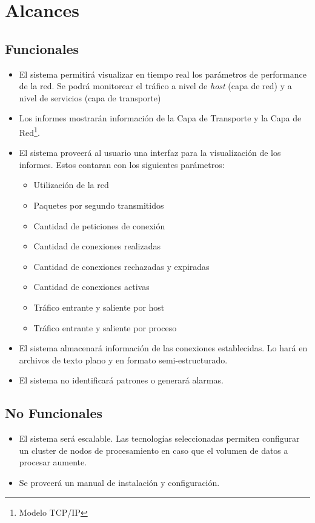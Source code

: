\section*{Alcances}

\subsection*{Funcionales}
\begin{itemize}
	\item El sistema permitirá visualizar en tiempo real los parámetros de performance de la red. Se podrá monitorear el tráfico a nivel de \textit{host} (capa de red) y a nivel de servicios (capa de transporte)
	\item Los informes mostrarán información de la Capa de Transporte y la Capa de Red\footnote{Modelo TCP/IP}. \cite{rfc791}\cite{rfc793}\cite{rfc1180}
	\item El sistema proveerá al usuario una interfaz para la visualización de los informes. Estos contaran con los siguientes parámetros:
	\begin{itemize}
		\item Utilización de la red
		\item Paquetes por segundo transmitidos
		\item Cantidad de peticiones de conexión
		\item Cantidad de conexiones realizadas
		\item Cantidad de conexiones rechazadas y expiradas
		\item Cantidad de conexiones activas
		\item Tráfico entrante y saliente por host
		\item Tráfico entrante y saliente por proceso
	\end{itemize}
	\item El sistema almacenará información de las conexiones establecidas. Lo hará en archivos de texto plano y en formato semi-estructurado.
	\item El sistema no identificará patrones o generará alarmas.
\end{itemize}

\subsection*{No Funcionales}
\begin{itemize}
	\item El sistema será escalable. Las tecnologías seleccionadas permiten configurar un cluster de nodos de procesamiento en caso que el volumen de datos a procesar aumente.
	\item Se proveerá un manual de instalación y configuración.
\end{itemize}
 
